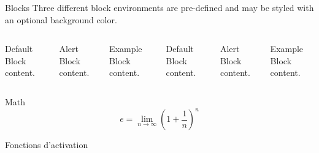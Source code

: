 \documentclass[10pt]{beamer}
\begin{document}
\begin{frame}{Blocks}
  Three different block environments are pre-defined and may be styled with an
  optional background color.

  \begin{columns}[T,onlytextwidth]
      \begin{block}{Default}
        Block content.
      \end{block}

      \begin{alertblock}{Alert}
        Block content.
      \end{alertblock}

      \begin{exampleblock}{Example}
        Block content.
      \end{exampleblock}



      \begin{block}{Default}
        Block content.
      \end{block}

      \begin{alertblock}{Alert}
        Block content.
      \end{alertblock}

      \begin{exampleblock}{Example}
        Block content.
      \end{exampleblock}

  \end{columns}
\end{frame}
\begin{frame}{Math}
  \begin{equation*}
    e = \lim_{n\to \infty} \left(1 + \frac{1}{n}\right)^n
  \end{equation*}
\end{frame}

\begin{frame}{Fonctions d'activation}
  \begin{figure}
  \end{figure}
\end{frame}
\end{document}
